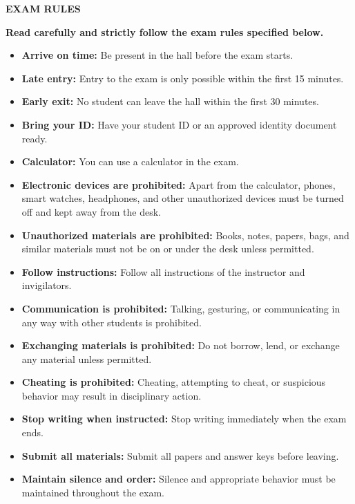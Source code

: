\documentclass[12pt,a4paper]{exam}
\newlength{\ContentTopOffset}
\begin{document}
\vspace*{\ContentTopOffset}

{\small
\vspace{0.3cm}
\begin{center}
\textbf{EXAM RULES}
\end{center}
\vspace{0.1cm}
\noindent\textbf{Read carefully and strictly follow the exam rules specified below.}
\vspace{-0.1cm}
\begin{itemize}\setlength{\itemsep}{0pt}\setlength{\parskip}{0pt}\setlength{\parsep}{0pt}
    
    \item \textbf{Arrive on time:} Be present in the hall before the exam starts.
    \item \textbf{Late entry:} Entry to the exam is only possible within the first 15 minutes.
    \item \textbf{Early exit:} No student can leave the hall within the first 30 minutes.
    \item \textbf{Bring your ID:} Have your student ID or an approved identity document ready.
    \item \textbf{Calculator:} You can use a calculator in the exam.
    \item \textbf{Electronic devices are prohibited:} Apart from the calculator, phones, smart watches, headphones, and other unauthorized devices must be turned off and kept away from the desk.
    \item \textbf{Unauthorized materials are prohibited:} Books, notes, papers, bags, and similar materials must not be on or under the desk unless permitted.
    \item \textbf{Follow instructions:} Follow all instructions of the instructor and invigilators.
    \item \textbf{Communication is prohibited:} Talking, gesturing, or communicating in any way with other students is prohibited.
    \item \textbf{Exchanging materials is prohibited:} Do not borrow, lend, or exchange any material unless permitted.
    \item \textbf{Cheating is prohibited:} Cheating, attempting to cheat, or suspicious behavior may result in disciplinary action.
    \item \textbf{Stop writing when instructed:} Stop writing immediately when the exam ends.
    \item \textbf{Submit all materials:} Submit all papers and answer keys before leaving.
    \item \textbf{Maintain silence and order:} Silence and appropriate behavior must be maintained throughout the exam.
\end{itemize}

}
\end{document}

